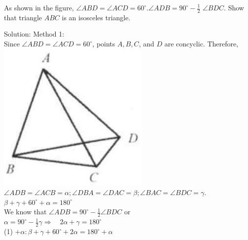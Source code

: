 \documentclass{article}
\begin{document}
As shown in the figure, \(\angle A B D=\angle A C D=60^{\circ} . \angle A D B=90^{\circ}-\frac{1}{2}\) \(\angle B D C\). Show that triangle \(A B C\) is an isosceles triangle.

Solution:
Method 1:\\
Since \(\angle A B D=\angle A C D=60^{\circ}\), points \(A, B, C\), and \(D\) are concyclic. Therefore,\\
\centering
\includegraphics[width=\textwidth]{images/196(2).jpg}\\
\(\angle A D B=\angle A C B=\alpha ; \angle D B A=\angle D A C=\beta ; \angle B A C=\angle B D C=\gamma\).\\
\(\beta+\gamma+60^{\circ}+\alpha=180^{\circ}\)\\
We know that \(\angle A D B=90^{\circ}-\frac{1}{2} \angle B D C\) or\\
\(\alpha=90^{\circ}-\frac{1}{2} \gamma \Rightarrow \quad 2 \alpha+\gamma=180^{\circ}\)\\
(1) \(+\alpha: \beta+\gamma+60^{\circ}+2 \alpha=180^{\circ}+\alpha\)\\
\centering
\end{document}
